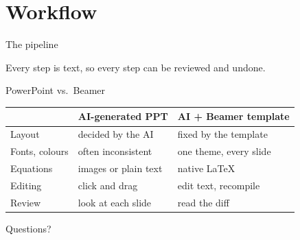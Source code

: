 \documentclass[aspectratio=169]{beamer}
\begin{document}
\section{Workflow}

\begin{frame}{The pipeline}
  \centering
  \vspace{1.2em}

  \small Every step is text, so every step can be reviewed and undone.
\end{frame}

\begin{frame}{PowerPoint vs.\ Beamer}
  \centering
  \begin{tabular}{@{}lll@{}}
    \toprule
    & AI-generated PPT & AI + Beamer template \\
    \midrule
    Layout      & decided by the AI      & fixed by the template \\
    Fonts, colours & often inconsistent  & one theme, every slide \\
    Equations   & images or plain text   & native LaTeX \\
    Editing     & click and drag         & edit text, recompile \\
    Review      & look at each slide     & read the diff \\
    \bottomrule
  \end{tabular}
\end{frame}

\begin{frame}[standout]
  Questions?
\end{frame}
\end{document}
